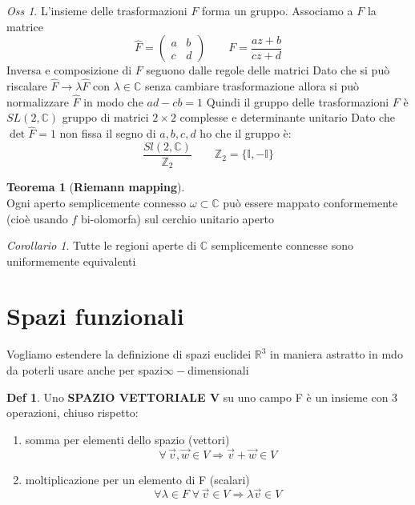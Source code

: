 \documentclass[a4paper,11pt]{report}
\theoremstyle{remark}
\newtheorem*{oss}{Oss}
\newtheorem*{coro}{Corollario}
\theoremstyle{definition}
\newtheorem*{teo}{Teorema}
\newtheorem*{Def}{Def}
\newcommand{\C}{\mathbb{C}}
\newcommand{\R}{\mathbb{R}}
\begin{document}
	\begin{oss}
		L'insieme delle trasformazioni $F$ forma un gruppo. Associamo a $F$ la matrice 
		\[
		\hat{F} = 
		\left(\begin{matrix}
			a & b \\ c & d
		\end{matrix}\right)
		\qquad F = \frac{az + b}{cz+d}
		\]
		Inversa e composizione di $F$ seguono dalle regole delle matrici \newline
		Dato che si può riscalare $\hat{F} \rightarrow \lambda \hat{F}$ con $\lambda \in \C$ senza cambiare trasformazione allora si può normalizzare $\hat{F}$ in modo che $ ad-cb = 1$ \newline
		Quindi il gruppo delle trasformazioni $F$ è $SL(2, \C)$ gruppo di matrici $2 \times 2$ complesse e determinante unitario \newline
		Dato che $\det \hat{F} = 1$ non fissa il segno di $a,b,c,d$ ho che il gruppo è:
		\[\frac{Sl(2,\C)}{\mathbb{Z}_2} \qquad \mathbb{Z}_2 = \{\mathbb{I}, - \mathbb{I}\}\] 
	\end{oss}
	\begin{teo}[\textbf{Riemann mapping}]\hfill\\
		Ogni aperto semplicemente connesso $\omega \subset \C$ può essere mappato conformemente (cioè usando $f$ bi-olomorfa) sul cerchio unitario aperto
	\end{teo}
	\begin{coro}
		Tutte le regioni aperte di $\C$ semplicemente connesse sono uniformemente equivalenti 
	\end{coro}

\part{Spazi funzionali}

Vogliamo estendere la definizione di spazi euclidei $\R^3$ in maniera astratto in mdo da poterli usare anche per spazi$\infty-$dimensionali

\begin{Def}
	Uno \textbf{SPAZIO VETTORIALE V} su uno campo F è un insieme con 3 operazioni, chiuso rispetto:
	\begin{enumerate}
		\item somma per elementi dello spazio (vettori)
		\[\forall \, \vec{v},\vec{w} \in V \Rightarrow \vec{v}+\vec{w} \in V\]
		\item moltiplicazione per un elemento di F (scalari)
		\[\forall \lambda \in F \; \forall \, \vec{v}\in V \Rightarrow \lambda\vec{v} \in V\]
	\end{enumerate}
\end{Def}
\end{document}

